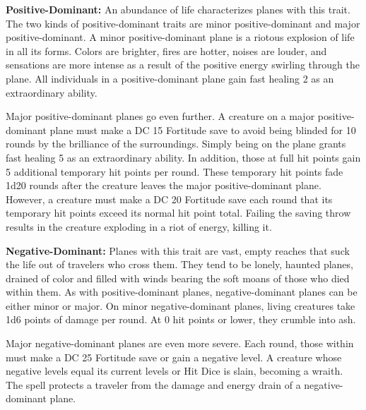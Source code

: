 \textbf{Positive-Dominant:} An abundance of life characterizes planes with this trait. The two kinds of positive-dominant traits are minor positive-dominant and major positive-dominant. A minor positive-dominant plane is a riotous explosion of life in all its forms. Colors are brighter, fires are hotter, noises are louder, and sensations are more intense as a result of the positive energy swirling through the plane. All individuals in a positive-dominant plane gain fast healing 2 as an extraordinary ability.

Major positive-dominant planes go even further. A creature on a major positive-dominant plane must make a DC 15 Fortitude save to avoid being blinded for 10 rounds by the brilliance of the surroundings. Simply being on the plane grants fast healing 5 as an extraordinary ability. In addition, those at full hit points gain 5 additional temporary hit points per round. These temporary hit points fade 1d20 rounds after the creature leaves the major positive-dominant plane. However, a creature must make a DC 20 Fortitude save each round that its temporary hit points exceed its normal hit point total. Failing the saving throw results in the creature exploding in a riot of energy, killing it.

\textbf{Negative-Dominant:} Planes with this trait are vast, empty reaches that suck the life out of travelers who cross them. They tend to be lonely, haunted planes, drained of color and filled with winds bearing the soft moans of those who died within them. As with positive-dominant planes, negative-dominant planes can be either minor or major. On minor negative-dominant planes, living creatures take 1d6 points of damage per round. At 0 hit points or lower, they crumble into ash.

Major negative-dominant planes are even more severe. Each round, those within must make a DC 25 Fortitude save or gain a negative level. A creature whose negative levels equal its current levels or Hit Dice is slain, becoming a wraith. The  spell protects a traveler from the damage and energy drain of a negative-dominant plane.
